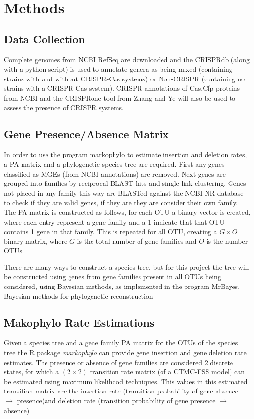 \documentclass[12pt,letter]{article}
\begin{document}
\section{\huge Methods}
\subsection{Data Collection}
Complete genomes from NCBI RefSeq are downloaded and the CRISPRdb (along with a python script) is used to annotate genera as being mixed (containing strains with and without CRISPR-Cas systems) or Non-CRISPR (containing no strains with a CRISPR-Cas system)\citep{crispdb}.
CRISPR annotations of Cas,Cfp proteins from NCBI and the CRISPRone tool from Zhang and Ye will also be used to assess the presence of CRISPR systems\citep{ineqcas}.
\subsection{Gene Presence/Absence Matrix}
In order to use the program markophylo to estimate insertion and deletion rates, a PA matrix and a phylogenetic species tree are required.
First any genes classified as MGEs (from NCBI annotations) are removed.
Next genes are grouped into families by reciprocal BLAST hits and single link clustering.
Genes not placed in any family this way are BLASTed against the NCBI NR database to check if they are valid genes, if they are they are consider their own family.
The PA matrix is constructed as follows, for each OTU a binary vector is created, where each entry represent a gene family and a 1 indicate that that OTU contains 1 gene in that family.
This is repeated for all OTU, creating a $G \times O$ binary matrix, where $G$ is the total number of gene families and $O$ is the number OTUs.\par
There are many ways to construct a species tree, but for this project the tree will be constructed using genes from gene families present in all OTUs being considered, using Bayesian methods, as implemented in the program MrBayes.
Bayesian methods for phylogenetic reconstruction
\subsection{Makophylo Rate Estimations}
Given a species tree and a gene family PA matrix for the OTUs of the species tree the R package \textit{markophylo} can provide gene insertion and gene deletion rate estimates.
The presence or absence of gene families are considered 2 discrete states, for which a $(2\times 2)$ transition rate matrix (of a CTMC-FSS model) can be estimated using maximum likelihood techniques.
This values in this estimated transition matrix are the insertion rate (transition probability of gene absence $\to$ presence)and deletion rate (transition probability of gene presence $\to$ absence)
\end{document}
